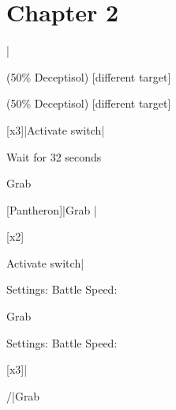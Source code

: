 \section{Chapter 2}

\begin{mainlist}
	\item {}
	\item {} \to{}|\skip
	\item {} (50\% Deceptisol) [different target]
	\item {} (50\% Deceptisol) [different target]
	\item {}
	\item {} [x3]|Activate switch|
	\item {} Wait for 32 seconds
	\item Grab 
	\item {} [Pantheron]|Grab |
	\item {} [x2]
	\item Activate switch|\skip
\end{mainlist}

\begin{menu}
	\item Settings: Battle Speed: 
\end{menu}

\begin{mainlist}
	\item {}
	\item {} 
	\item Grab 
\end{mainlist}

\begin{menu}
	\item Settings: Battle Speed: 
\end{menu}

\begin{mainlist}
	\item \skip
	\item {} [x3]|
	\item {} /|Grab 
\end{mainlist}

